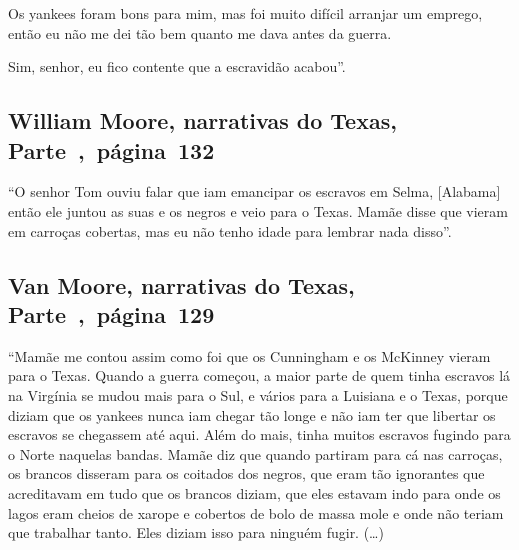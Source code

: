 Os yankees foram bons para mim, mas foi muito difícil arranjar um
emprego, então eu não me dei tão bem quanto me dava antes da guerra.

Sim, senhor, eu fico contente que a escravidão acabou''.

\subsection{William Moore, narrativas do Texas, Parte~,~página~132}
\label{ref199}

``O senhor Tom ouviu falar que iam emancipar os escravos em Selma,
{[}Alabama{]} então ele juntou as suas e os negros e veio para o Texas.
Mamãe disse que vieram em carroças cobertas, mas eu não tenho idade para
lembrar nada disso''.

\subsection{Van Moore, narrativas do Texas, Parte~,~página~129}
\label{ref196}

``Mamãe me contou assim como foi que os Cunningham e os McKinney vieram
para o Texas. Quando a guerra começou, a maior parte de quem tinha
escravos lá na Virgínia se mudou mais para o Sul, e vários para a
Luisiana e o Texas, porque diziam que os yankees nunca iam chegar tão
longe e não iam ter que libertar os escravos se chegassem até aqui. Além
do mais, tinha muitos escravos fugindo para o Norte naquelas bandas.
Mamãe diz que quando partiram para cá nas carroças, os brancos disseram
para os coitados dos negros, que eram tão ignorantes que acreditavam em
tudo que os brancos diziam, que eles estavam indo para onde os lagos
eram cheios de xarope e cobertos de bolo de massa mole e onde não teriam
que trabalhar tanto. Eles diziam isso para ninguém fugir. (\ldots{})

